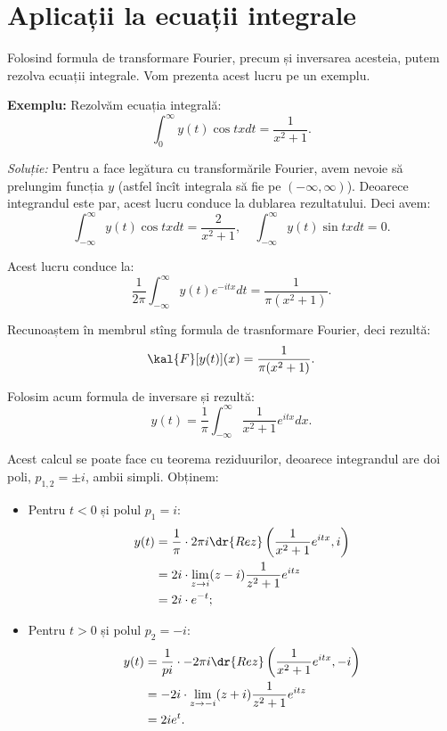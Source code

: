 \section{Aplicații la ecuații integrale}

Folosind formula de transformare Fourier, precum și inversarea acesteia,
putem rezolva ecuații integrale. Vom prezenta acest lucru pe un exemplu.

\textbf{Exemplu:} Rezolvăm ecuația integrală:
\[
    \int_0^\infty y(t) \cos tx dt = \dfrac{1}{x^2 + 1}.
\]

\emph{Soluție:} Pentru a face legătura cu transformările Fourier,
avem nevoie să prelungim funcția $ y $ (astfel încît integrala
să fie pe $ (-\infty, \infty) $). Deoarece integrandul este par,
acest lucru conduce la dublarea rezultatului. Deci avem:
\[
    \int_{-\infty}^\infty y(t) \cos tx dt = \dfrac{2}{x^2 + 1}, \quad %
    \int_{-\infty}^\infty y(t) \sin tx dt = 0.
\]

Acest lucru conduce la:
\[
    \dfrac{1}{ 2\pi} \int_{-\infty}^\infty y(t) e^{-itx} dt = \dfrac{1}{\pi(x^2 + 1)}.
\]

Recunoaștem în membrul stîng formula de trasnformare Fourier,
deci rezultă:
\[
    \kal{F}[y(t)](x) = \dfrac{1}{\pi(x^2 + 1)}.
\]

Folosim acum formula de inversare și rezultă:
\[
    y(t) = \dfrac{1}{\pi} \int_{-\infty}^\infty \dfrac{1}{x^2 + 1} e^{itx} dx.
\]

Acest calcul se poate face cu teorema reziduurilor, deoarece integrandul
are doi poli, $ p_{1,2} = \pm i $, ambii simpli. Obținem:
\begin{itemize}
    \item Pentru $ t < 0 $ și polul $ p_1 = i $:
        \begin{align*}
            y(t) &= \dfrac{1}{\pi} \cdot 2 \pi i \dr{Rez}\left(\dfrac{1}{x^2 + 1} e^{itx}, i\right) \\
                 &= 2 i \cdot \lim_{z \to i} (z - i) \dfrac{1}{z^2 + 1} e^{itz} \\
                 &= 2i \cdot e^{-t};
        \end{align*}
    \item Pentru $ t > 0 $ și polul $ p_2 = -i $:
        \begin{align*}
            y(t) &= \dfrac{1}{pi} \cdot - 2\pi i \dr{Rez}\left( \dfrac{1}{x^2 + 1} e^{itx}, -i\right) \\
                 &= -2i \cdot \lim_{z \to -i} (z + i) \dfrac{1}{z^2 + 1} e^{itz} \\
                 &= 2i e^{t}.
        \end{align*}
\end{itemize}

